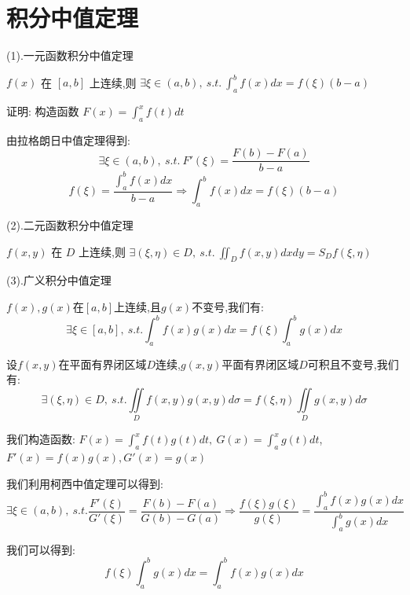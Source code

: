 \section{积分中值定理}
\begin{theorem}[积分中值定理]

	(1).一元函数积分中值定理

	$f(x)$ 在 $[a,b]$ 上连续,则 $\exists \xi\in(a,b),\ s.t.\ \int_{a}^{b}f(x)dx=f(\xi)(b-a)$

	证明: 构造函数 $F(x)=\int_{a}^{x}f(t)dt$

	由拉格朗日中值定理得到: $$\exists \xi\in(a,b),\ s.t.\ F'(\xi)=\frac{F(b)-F(a)}{b-a}$$
	$$f(\xi)=\frac{\int_{a}^{b}f(x)dx}{b-a}\Rightarrow \int_{a}^{b}f(x)dx=f(\xi)(b-a)$$

	(2).二元函数积分中值定理

	$f(x,y)$ 在 $D$ 上连续,则 $\exists (\xi,\eta)\in D,\ s.t.\ \iint_{D}f(x,y)dxdy=S_{D}f(\xi,\eta)$

	(3).广义积分中值定理

	$f(x),g(x)$在$[a,b]$上连续,且$g(x)$不变号,我们有:
	$$\exists \xi\in[a,b],\ s.t. \int_{a}^{b}f(x)g(x)dx=f(\xi)\int_{a}^{b}g(x)dx$$

	设$f(x,y)$在平面有界闭区域$D$连续,$g(x,y)$平面有界闭区域$D$可积且不变号,我们有: $$\exists (\xi,\eta)\in D,\ s.t. \iint\limits_{D}f(x,y)g(x,y)d\sigma=f(\xi,\eta)\iint\limits_{D}g(x,y)d\sigma$$
	\begin{anymark}[注]
		我们构造函数: $F(x)=\int_{a}^{x}f(t)g(t)dt,\ G(x)=\int_{a}^{x}g(t)dt$,$F'(x) =f(x)g(x),G'(x) = g(x)$

		我们利用柯西中值定理可以得到:
		$$\exists \xi\in(a,b),\ s.t. \dfrac{F'(\xi)}{G'(\xi)}=\dfrac{F(b)-F(a)}{G(b)-G(a)}\Rightarrow \dfrac{f(\xi)g(\xi)}{g(\xi)}=\dfrac{\int_{a}^{b}f(x)g(x)dx}{\int_{a}^{b}g(x)dx}$$

		我们可以得到: $$f(\xi)\int_{a}^{b}g(x)dx=\int_{a}^{b}f(x)g(x)dx$$
	\end{anymark}
\end{theorem}
